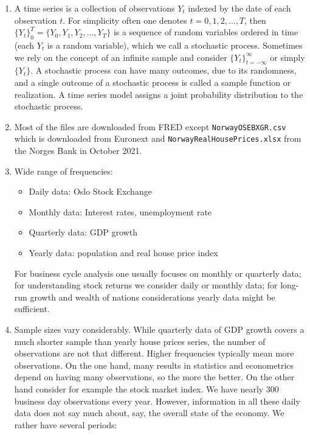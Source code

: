 \begin{enumerate}
\item A time series is a collection of observations \(Y_t\) indexed by the date of each observation \(t\).
For simplicity often one denotes \(t=0,1,2,\ldots ,T\),
  then \( {\{Y_t\}}_0^T = \{Y_0,Y_1,Y_2,\ldots ,Y_T\} \) is a sequence of random variables ordered in time
  (each \(Y_t\) is a random variable), which we call a stochastic process.
Sometimes we rely on the concept of an infinite sample and consider \( {\{Y_t\}}_{t=-\infty}^\infty \) or simply \( \{Y_t\} \).
A stochastic process can have many outcomes, due to its randomness,
  and a single outcome of a stochastic process is called a sample function or realization.
A time series model assigns a joint probability distribution to the stochastic process.
\item Most of the files are downloaded from FRED except \texttt{NorwayOSEBXGR.csv} which is downloaded from Euronext and \texttt{NorwayRealHousePrices.xlsx} from the Norges Bank in October 2021.

\item Wide range of frequencies:
\begin{itemize}
    \item Daily data: Oslo Stock Exchange
    \item Monthly data: Interest rates, unemployment rate
    \item Quarterly data: GDP growth
    \item Yearly data: population and real house price index
\end{itemize}
For business cycle analysis one usually focuses on monthly or quarterly data;
  for understanding stock returns we consider daily or monthly data;
  for long-run growth and wealth of nations considerations yearly data might be sufficient.
\item Sample sizes vary considerably. While quarterly data of GDP growth covers a much shorter sample than yearly house prices series,
  the number of observations are not that different.
Higher frequencies typically mean more observations.
On the one hand, many results in statistics and econometrics depend on having many observations, so the more the better.
On the other hand consider for example the stock market index.
We have nearly 300 business day observations every year.
However, information in all these daily data does not say much about, say, the overall state of the economy.
We rather have several periods:

\end{enumerate}
